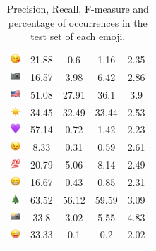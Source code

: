 \documentclass{article}
\begin{document}
\begin{table}
\begin{tabular}{|c|ccc|c|}
\includegraphics[height=0.37cm,width=0.37cm]{img/face_blowing_a_kiss.png} & 21.88 & 0.6 & 1.16 & 2.35\\ 
\includegraphics[height=0.37cm,width=0.37cm]{img/camera.png} & 16.57 & 3.98 & 6.42 & 2.86\\ 
\includegraphics[height=0.37cm,width=0.37cm]{img/United_States.png} & 51.08 & 27.91 & 36.1 & 3.9\\ 
\includegraphics[height=0.37cm,width=0.37cm]{img/sun.png} & 34.45 & 32.49 & 33.44 & 2.53\\ 
\includegraphics[height=0.37cm,width=0.37cm]{img/purple_heart.png} & 57.14 & 0.72 & 1.42 & 2.23\\ 
\includegraphics[height=0.37cm,width=0.37cm]{img/winking_face.png} & 8.33 & 0.31 & 0.59 & 2.61\\ 
\includegraphics[height=0.37cm,width=0.37cm]{img/hundred_points.png} & 20.79 & 5.06 & 8.14 & 2.49\\ 
\includegraphics[height=0.37cm,width=0.37cm]{img/beaming_face_with_smiling_eyes.png} & 16.67 & 0.43 & 0.85 & 2.31\\ 
\includegraphics[height=0.37cm,width=0.37cm]{img/Christmas_tree.png} & 63.52 & 56.12 & 59.59 & 3.09\\ 
\includegraphics[height=0.37cm,width=0.37cm]{img/camera_with_flash.png} & 33.8 & 3.02 & 5.55 & 4.83\\ 
\includegraphics[height=0.37cm,width=0.37cm]{img/winking_face_with_tongue.png} & 33.33 & 0.1 & 0.2 & 2.02\\ 

\hline
\end{tabular}
\caption{\label{table:emoji_detailed} Precision, Recall, F-measure and percentage of occurrences in the test set of each emoji.}
\end{table}
\end{document}
